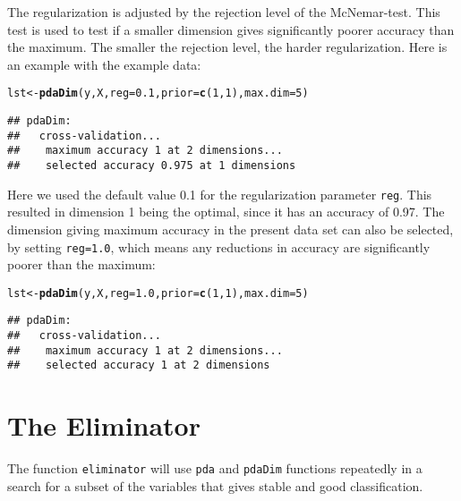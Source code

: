 \documentclass[a4paper]{article}\usepackage[]{graphicx}\usepackage[]{color}
\makeatletter
\newcommand{\hlnum}[1]{\textcolor[rgb]{0.686,0.059,0.569}{#1}}%
\newcommand{\hlstd}[1]{\textcolor[rgb]{0.345,0.345,0.345}{#1}}%
\newcommand{\hlkwb}[1]{\textcolor[rgb]{0.69,0.353,0.396}{#1}}%
\newcommand{\hlkwc}[1]{\textcolor[rgb]{0.333,0.667,0.333}{#1}}%
\newcommand{\hlkwd}[1]{\textcolor[rgb]{0.737,0.353,0.396}{\textbf{#1}}}%
\newenvironment{kframe}{%
 \def\at@end@of@kframe{}%
 \ifinner\ifhmode%
  \def\at@end@of@kframe{\end{minipage}}%
  \begin{minipage}{\columnwidth}%
 \fi\fi%
 \def\FrameCommand##1{\hskip\@totalleftmargin \hskip-\fboxsep
 \colorbox{shadecolor}{##1}\hskip-\fboxsep
     \hskip-\linewidth \hskip-\@totalleftmargin \hskip\columnwidth}%
 \MakeFramed {\advance\hsize-\width
   \@totalleftmargin\z@ \linewidth\hsize
   \@setminipage}}%
 {\par\unskip\endMakeFramed%
 \at@end@of@kframe}
\newenvironment{knitrout}{}{} %
\makeatother
\begin{document}
The regularization is adjusted by the rejection level of the McNemar-test. This test is used to test if a smaller dimension gives significantly poorer accuracy than the maximum. The smaller the rejection level, the harder regularization. Here is an example with the example data:
\begin{knitrout}
\color{fgcolor}\begin{kframe}
\begin{alltt}
\hlstd{lst} \hlkwb{<-} \hlkwd{pdaDim}\hlstd{(y,X,}\hlkwc{reg}\hlstd{=}\hlnum{0.1}\hlstd{,}\hlkwc{prior}\hlstd{=}\hlkwd{c}\hlstd{(}\hlnum{1}\hlstd{,}\hlnum{1}\hlstd{),}\hlkwc{max.dim}\hlstd{=}\hlnum{5}\hlstd{)}
\end{alltt}
\begin{verbatim}
## pdaDim:
##   cross-validation...
##    maximum accuracy 1 at 2 dimensions...
##    selected accuracy 0.975 at 1 dimensions
\end{verbatim}
\end{kframe}
\end{knitrout}
Here we used the default value 0.1 for the regularization parameter \texttt{reg}. This resulted in dimension 1 being the optimal, since it has an accuracy of 0.97. The dimension giving maximum accuracy in the present data set can also be selected, by setting \texttt{reg=1.0}, which means any reductions in accuracy are significantly poorer than the maximum:
\begin{knitrout}
\color{fgcolor}\begin{kframe}
\begin{alltt}
\hlstd{lst} \hlkwb{<-} \hlkwd{pdaDim}\hlstd{(y,X,}\hlkwc{reg}\hlstd{=}\hlnum{1.0}\hlstd{,}\hlkwc{prior}\hlstd{=}\hlkwd{c}\hlstd{(}\hlnum{1}\hlstd{,}\hlnum{1}\hlstd{),}\hlkwc{max.dim}\hlstd{=}\hlnum{5}\hlstd{)}
\end{alltt}
\begin{verbatim}
## pdaDim:
##   cross-validation...
##    maximum accuracy 1 at 2 dimensions...
##    selected accuracy 1 at 2 dimensions
\end{verbatim}
\end{kframe}
\end{knitrout}



\section{The Eliminator}
The function \texttt{eliminator} will use \texttt{pda} and \texttt{pdaDim} functions repeatedly in a search for a subset of the variables that gives stable and good classification.
\end{document}

